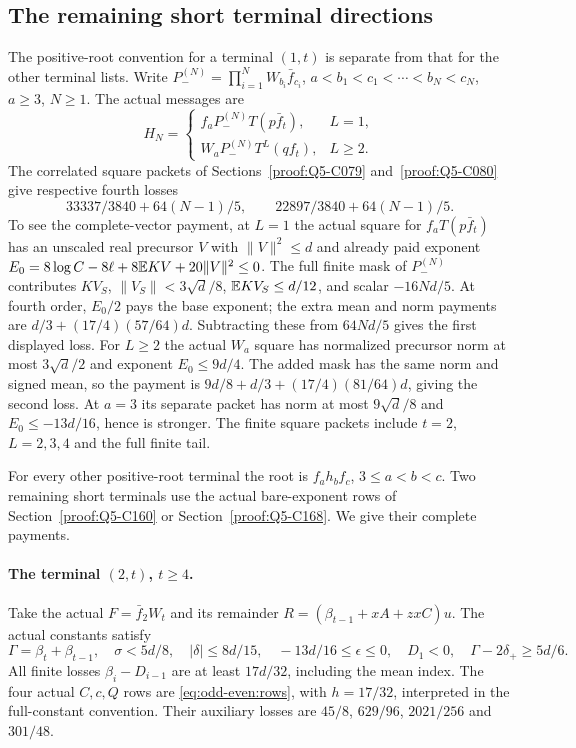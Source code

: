 \subsection{The remaining short terminal directions}
\label{sec:odd-complete:short-exceptions}

The positive-root convention for a terminal $(1,t)$ is separate
from that for the other terminal lists. Write
$P_-^{(N)}=\prod_{i=1}^N W_{b_i}\bar f_{c_i}$,
$a<b_1<c_1<\cdots<b_N<c_N$, $a\ge3$, $N\ge1$.
The actual messages are
\begin{equation}\label{eq:odd-short:directions}
 H_N=\begin{cases}
 f_aP_-^{(N)}T(p\bar f_t),&L=1,\\
 W_aP_-^{(N)}T^L(qf_t),&L\ge2.
 \end{cases}
\end{equation}
The correlated square packets of Sections~\ref{proof:Q5-C079}
and~\ref{proof:Q5-C080} give respective fourth losses
\begin{equation}\label{eq:odd-short:whole-pairs}
 33337/3840+64(N-1)/5,\qquad
 22897/3840+64(N-1)/5.
\end{equation}
To see the complete-vector payment, at $L=1$ the actual square
for $f_aT(p\bar f_t)$ has an unscaled real precursor $V$ with
$\|V\|^2\le d$ and already paid exponent
$E_0=8\log C-8\ell+8\mathbb E KV+20\|V\|^2\le0$.
The full finite mask of $P_-^{(N)}$ contributes $KV_S$,
$\|V_S\|<3\sqrt d/8$, $\mathbb E KV_S\le d/12$, and scalar
$-16Nd/5$. At fourth order, $E_0/2$ pays the base exponent;
the extra mean and norm payments are
$d/3+(17/4)(57/64)d$. Subtracting these from $64Nd/5$
gives the first displayed loss.
For $L\ge2$ the actual $W_a$ square has normalized precursor
norm at most $3\sqrt d/2$ and exponent $E_0\le9d/4$.
The added mask has the same norm and signed mean, so the payment
is $9d/8+d/3+(17/4)(81/64)d$, giving the second loss.
At $a=3$ its separate packet has norm at most $9\sqrt d/8$
and $E_0\le-13d/16$, hence is stronger. The finite square
packets include $t=2$, $L=2,3,4$ and the full finite tail.

For every other positive-root terminal the root is $f_a h_bf_c$,
$3\le a<b<c$. Two remaining short terminals use the actual
bare-exponent rows of Section~\ref{proof:Q5-C160} or
Section~\ref{proof:Q5-C168}. We give their complete payments.

\paragraph{The terminal $(2,t)$, $t\ge4$.}
Take the actual $F=\bar f_2W_t$ and its remainder
$R=(\beta_{t-1}+xA+zxC)u$.
The actual constants satisfy
\[
 \Gamma=\beta_t+\beta_{t-1},\quad
 \sigma<5d/8,\quad |\delta|\le8d/15,\quad
 -13d/16\le\epsilon\le0,\quad D_1<0,
 \quad\Gamma-2\delta_+\ge5d/6.
\]
All finite losses $\beta_i-D_{i-1}$ are at least $17d/32$,
including the mean index. The four actual $C,c,Q$ rows are
\eqref{eq:odd-even:rows}, with $h=17/32$, interpreted in the
full-constant convention. Their auxiliary losses are
$45/8$, $629/96$, $2021/256$ and $301/48$.

